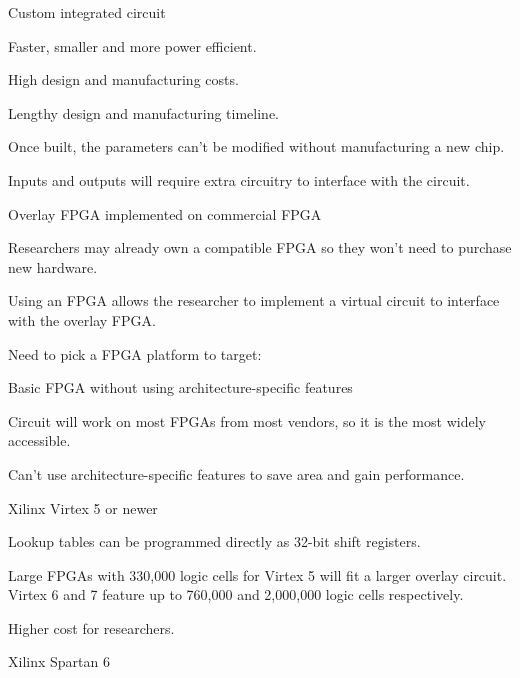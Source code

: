 \begin{enumeration}
\item Custom integrated circuit \
	\begin{itemlist}
		\item Faster, smaller and more power efficient.
		\item High design and manufacturing costs.
		\item Lengthy design and manufacturing timeline.
		\item Once built, the parameters can't be modified without manufacturing a new chip.
		\item Inputs and outputs will require extra circuitry to interface with the circuit.
	\end{itemlist}
\item Overlay FPGA implemented on commercial FPGA \
	\begin{itemlist}
		\item Researchers may already own a compatible FPGA so they won't need to purchase new hardware.
		\item Using an FPGA allows the researcher to implement a virtual circuit to interface with the overlay FPGA.
		\item Need to pick a FPGA platform to target:
		\begin{enumeration}
			\item Basic FPGA without using architecture-specific features
				\begin{itemlist}
					\item Circuit will work on most FPGAs from most vendors, so it is the most widely accessible.
					\item Can't use architecture-specific features to save area and gain performance.
				\end{itemlist}
			\item Xilinx Virtex 5 or newer \
				\begin{itemlist}
					\item Lookup tables can be programmed directly as 32-bit shift registers.
					\item Large FPGAs with 330,000 logic cells for Virtex 5\cite{xilinx-virtex5} will fit a larger overlay circuit. Virtex 6 and 7 feature up to 760,000 and 2,000,000 logic cells respectively\cite{xilinx-models}.
					\item Higher cost for researchers.
				\end{itemlist}
			\item Xilinx Spartan 6 \
				\begin{itemlist}

\end{itemlist}
\end{enumeration}
\end{itemlist}
\end{enumeration}
